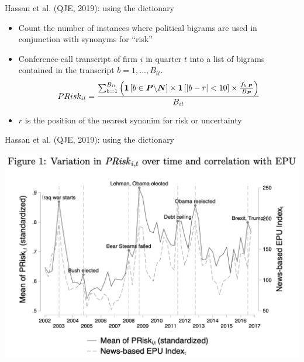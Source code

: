 \documentclass[english]{beamer}
\begin{document}
\begin{frame}{Hassan et al. (QJE, 2019): using the dictionary}
\begin{itemize}
\setlength{\itemsep}{1.5em}
\item Count the number of instances where political bigrams are used in conjunction with synonyms for ``risk''
\item Conference-call transcript of firm $i$ in quarter $t$ into a list of bigrams contained in the transcript $b=1,...,B_{it}$.
\vspace{7pt}
\begin{equation*}
PRisk_{it}=\frac{\sum_{b=1}^{B_{it}}\left( \boldsymbol{1}\left[ b\in 
\boldsymbol{P}\backslash \boldsymbol{N}\right] \times \boldsymbol{1}\left[
\left\vert b-r\right\vert <10\right] \times \frac{f_{b,\boldsymbol{P}}}{B_{%
\boldsymbol{P}}}\right) }{B_{it}}
\end{equation*}
\item $r$ is the position of the nearest synonim for risk or uncertainty
\end{itemize}
\end{frame}%

\begin{frame}{Hassan et al. (QJE, 2019): using the dictionary}
\vspace{-7pt}
\begin{center}
\includegraphics[scale=0.35]{Images/hassan_new1.png}
\end{center}
\end{frame}
\end{document}
